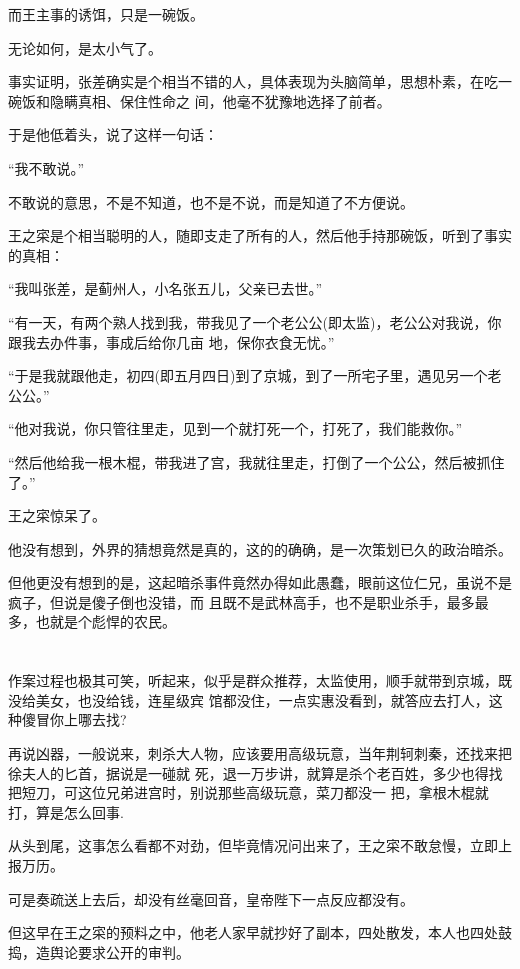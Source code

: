 \documentclass[11pt,a4paper,onecolumn]{article}
\begin{document}
而王主事的诱饵，只是一碗饭。

无论如何，是太小气了。

事实证明，张差确实是个相当不错的人，具体表现为头脑简单，思想朴素，在吃一碗饭和隐瞒真相、保住性命之
间，他毫不犹豫地选择了前者。

于是他低着头，说了这样一句话：

``我不敢说。''

不敢说的意思，不是不知道，也不是不说，而是知道了不方便说。

王之寀是个相当聪明的人，随即支走了所有的人，然后他手持那碗饭，听到了事实的真相：

``我叫张差，是蓟州人，小名张五儿，父亲已去世。''

``有一天，有两个熟人找到我，带我见了一个老公公(即太监)，老公公对我说，你跟我去办件事，事成后给你几亩
地，保你衣食无忧。''

``于是我就跟他走，初四(即五月四日)到了京城，到了一所宅子里，遇见另一个老公公。''

``他对我说，你只管往里走，见到一个就打死一个，打死了，我们能救你。''

``然后他给我一根木棍，带我进了宫，我就往里走，打倒了一个公公，然后被抓住了。''

王之寀惊呆了。

他没有想到，外界的猜想竟然是真的，这的的确确，是一次策划已久的政治暗杀。

但他更没有想到的是，这起暗杀事件竟然办得如此愚蠢，眼前这位仁兄，虽说不是疯子，但说是傻子倒也没错，而
且既不是武林高手，也不是职业杀手，最多最多，也就是个彪悍的农民。

\section[\thesection]{}

作案过程也极其可笑，听起来，似乎是群众推荐，太监使用，顺手就带到京城，既没给美女，也没给钱，连星级宾
馆都没住，一点实惠没看到，就答应去打人，这种傻冒你上哪去找?

再说凶器，一般说来，刺杀大人物，应该要用高级玩意，当年荆轲刺秦，还找来把徐夫人的匕首，据说是一碰就
死，退一万步讲，就算是杀个老百姓，多少也得找把短刀，可这位兄弟进宫时，别说那些高级玩意，菜刀都没一
把，拿根木棍就打，算是怎么回事.

从头到尾，这事怎么看都不对劲，但毕竟情况问出来了，王之寀不敢怠慢，立即上报万历。

可是奏疏送上去后，却没有丝毫回音，皇帝陛下一点反应都没有。

但这早在王之寀的预料之中，他老人家早就抄好了副本，四处散发，本人也四处鼓捣，造舆论要求公开的审判。
\end{document}
